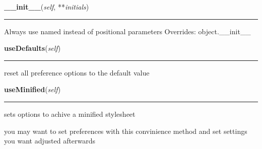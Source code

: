 \hspace{.8\funcindent}\begin{boxedminipage}{\funcwidth}

    \raggedright \textbf{\_\_init\_\_}(\textit{self}, **\textit{initials})

    \vspace{-1.5ex}

    \rule{\textwidth}{0.5\fboxrule}
\setlength{\parskip}{2ex}

Always use named instead of positional parameters
\setlength{\parskip}{1ex}
      Overrides: object.\_\_init\_\_

    \end{boxedminipage}

    \label{cssutils:serialize:Preferences:useDefaults}

    \vspace{0.5ex}

\hspace{.8\funcindent}\begin{boxedminipage}{\funcwidth}

    \raggedright \textbf{useDefaults}(\textit{self})

    \vspace{-1.5ex}

    \rule{\textwidth}{0.5\fboxrule}
\setlength{\parskip}{2ex}

reset all preference options to the default value
\setlength{\parskip}{1ex}
    \end{boxedminipage}

    \label{cssutils:serialize:Preferences:useMinified}

    \vspace{0.5ex}

\hspace{.8\funcindent}\begin{boxedminipage}{\funcwidth}

    \raggedright \textbf{useMinified}(\textit{self})

    \vspace{-1.5ex}

    \rule{\textwidth}{0.5\fboxrule}
\setlength{\parskip}{2ex}

sets options to achive a minified stylesheet

you may want to set preferences with this convinience method
and set settings you want adjusted afterwards
\setlength{\parskip}{1ex}
    \end{boxedminipage}

